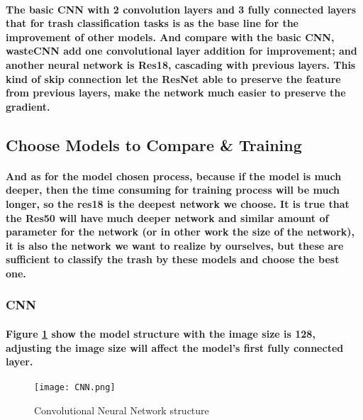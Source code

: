 \documentclass{article}
\begin{document}
    \paragraph{The basic CNN with 2 convolution layers and 3 fully connected layers that for trash classification tasks is as the base line for the improvement of other models. And compare with the basic CNN, wasteCNN add one convolutional layer addition for improvement; and another neural network is Res18, cascading with previous layers. This kind of skip connection let the ResNet able to preserve the feature from previous layers, make the network much easier to preserve the gradient.}


    \subsection*{Choose Models to Compare \& Training}
    \paragraph{And as for the model chosen process, because if the model is much deeper, then the time consuming for training process will be much longer, so the res18 is the deepest network we choose. It is true that the Res50 will have much deeper network and similar amount of parameter for the network (or in other work the size of the network), it is also the network we want to realize by ourselves, but these are sufficient to classify the trash by these models and choose the best one. }

        \subsubsection*{CNN}
        \paragraph{Figure \ref{fig:cnn_model} show the model structure with the image size is 128, adjusting the image size will affect the model’s first fully connected layer.}
        \begin{figure}
            \begin{centering}
            \texttt{[image: CNN.png]}
            \par\end{centering}
            \caption{Convolutional Neural Network structure}
            \label{fig:cnn_model}
        \end{figure}
\end{document}
